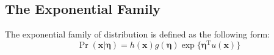 \subsection{The Exponential Family}
\begin{definition}
The exponential family of distribution is defined as the following form:
\begin{equation}
\Pr(\mathbf{x}\vert\boldsymbol{\eta})=h(\mathbf{x})g(\boldsymbol{\eta})\exp{}\{\boldsymbol{\eta}^{\mathrm{T}}u(\mathbf{x})\}
\label{eqn:exponentialfamily}
\end{equation}
\end{definition}

